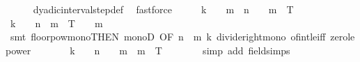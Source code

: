 \begin{isabellebody}
\ \ \ \ \isamarkupfalse%
\ dyadic{\isacharunderscore}{\kern0pt}interval{\isacharunderscore}{\kern0pt}step{\isacharunderscore}{\kern0pt}def\ \isamarkupfalse%
\ fastforce\isanewline
\ \ \isamarkupfalse%
\ \isamarkupfalse%
\ {\isachardoublequoteopen}k\ {\isacharasterisk}{\kern0pt}\ {}\ {\isacharcircum}{\kern0pt}\ {\isacharparenleft}{\kern0pt}m\ {\isacharminus}{\kern0pt}\ n{\isacharparenright}{\kern0pt}\ {\isasymin}\ {\isacharbraceleft}{\kern0pt}{}\ {\isachardot}{\kern0pt}{\isachardot}{\kern0pt}\ {\isasymlfloor}{}{\isacharcircum}{\kern0pt}m\ {\isacharasterisk}{\kern0pt}\ T{\isasymrfloor}{\isacharbraceright}{\kern0pt}{\isachardoublequoteclose}\isanewline
\ \ \isamarkupfalse%
\ {\isacharminus}{\kern0pt}\isanewline
\ \ \ \ \isamarkupfalse%
\ {\isachardoublequoteopen}k\ {\isacharslash}{\kern0pt}\ {}\ {\isacharcircum}{\kern0pt}\ n\ {\isasymle}\ {\isasymlfloor}{}{\isacharcircum}{\kern0pt}m\ {\isacharasterisk}{\kern0pt}\ T{\isasymrfloor}\ {\isacharslash}{\kern0pt}\ {}\ {\isacharcircum}{\kern0pt}\ m{\isachardoublequoteclose}\isanewline
\ \ \ \ \ \ \isamarkupfalse%
\ {\isacharparenleft}{\kern0pt}smt\ floor{\isacharunderscore}{\kern0pt}pow{}{\isacharunderscore}{\kern0pt}mono{\isacharbrackleft}{\kern0pt}THEN\ monoD{\isacharcomma}{\kern0pt}\ OF\ {\isacartoucheopen}n\ {\isasymle}\ m{\isacartoucheclose}{\isacharbrackright}{\kern0pt}\ k{\isacharparenleft}{\kern0pt}{}{\isacharparenright}{\kern0pt}\ divide{\isacharunderscore}{\kern0pt}right{\isacharunderscore}{\kern0pt}mono\ of{\isacharunderscore}{\kern0pt}int{\isacharunderscore}{\kern0pt}le{\isacharunderscore}{\kern0pt}iff\ zero{\isacharunderscore}{\kern0pt}le{\isacharunderscore}{\kern0pt}power{\isacharparenright}{\kern0pt}\isanewline
\ \ \ \ \isamarkupfalse%
\ \isamarkupfalse%
\ {\isachardoublequoteopen}k\ {\isacharslash}{\kern0pt}\ {}\ {\isacharcircum}{\kern0pt}\ n\ {\isacharasterisk}{\kern0pt}\ {}\ {\isacharcircum}{\kern0pt}\ m\ {\isasymle}\ {\isasymlfloor}{}{\isacharcircum}{\kern0pt}m\ {\isacharasterisk}{\kern0pt}\ T{\isasymrfloor}{\isachardoublequoteclose}\isanewline
\ \ \ \ \ \ \isamarkupfalse%
\ {\isacharparenleft}{\kern0pt}simp\ add{\isacharcolon}{\kern0pt}\ field{\isacharunderscore}{\kern0pt}simps{\isacharparenright}{\kern0pt}\isanewline
\ \ \ \ \isamarkupfalse%
\ \isamarkupfalse%

\end{isabellebody}
